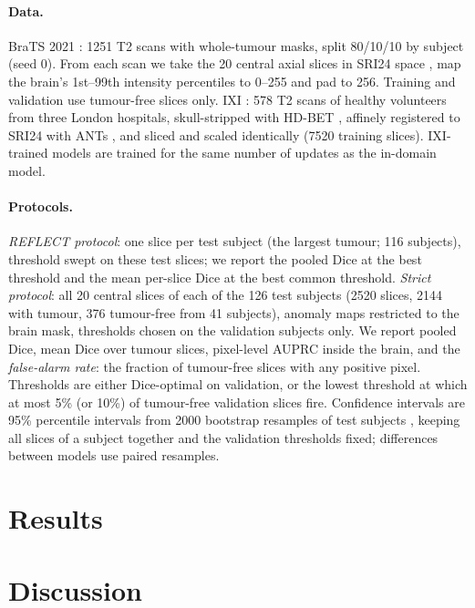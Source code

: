 \documentclass[10pt]{article}
\begin{document}
\paragraph{Data.}
BraTS 2021 \citep{baid2021brats,menze2015brats,bakas2017tcga}: 1251 T2 scans with whole-tumour masks, split 80/10/10 by subject (seed 0).
From each scan we take the 20 central axial slices in SRI24 space \citep{rohlfing2010sri24}, map the brain's 1st--99th intensity percentiles to 0--255 and pad to 256.
Training and validation use tumour-free slices only.
IXI \citep{ixi}: 578 T2 scans of healthy volunteers from three London hospitals, skull-stripped with HD-BET \citep{isensee2019hdbet}, affinely registered to SRI24 with ANTs \citep{avants2011ants}, and sliced and scaled identically (7520 training slices).
IXI-trained models are trained for the same number of updates as the in-domain model.

\paragraph{Protocols.}
\emph{REFLECT protocol}: one slice per test subject (the largest tumour; 116 subjects), threshold swept on these test slices; we report the pooled Dice at the best threshold and the mean per-slice Dice at the best common threshold.
\emph{Strict protocol}: all 20 central slices of each of the 126 test subjects (2520 slices, 2144 with tumour, 376 tumour-free from 41 subjects), anomaly maps restricted to the brain mask, thresholds chosen on the validation subjects only.
We report pooled Dice, mean Dice over tumour slices, pixel-level AUPRC inside the brain, and the \emph{false-alarm rate}: the fraction of tumour-free slices with any positive pixel.
Thresholds are either Dice-optimal on validation, or the lowest threshold at which at most 5\% (or 10\%) of tumour-free validation slices fire.
Confidence intervals are 95\% percentile intervals from 2000 bootstrap resamples of test subjects \citep{efron1986bootstrap}, keeping all slices of a subject together and the validation thresholds fixed; differences between models use paired resamples.

\section{Results}


\section{Discussion}




\end{document}
